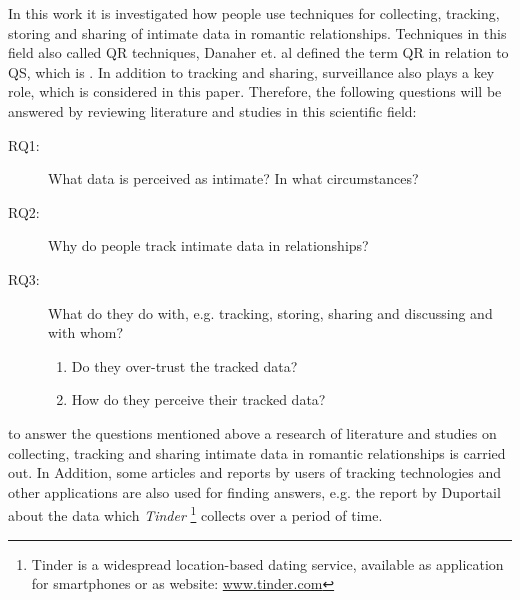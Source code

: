 In this work it is investigated how people use techniques for collecting, tracking, storing and sharing of intimate data in romantic relationships. Techniques in this field also called \ac{QR} techniques, Danaher et. al \cite{doi:10.1080/15265161.2017.1409823} defined the term \acs{QR} in relation to \ac{QS}, which is . In addition to tracking and sharing, surveillance also plays a key role, which is considered in this paper.
Therefore, the following questions will be answered by reviewing literature and studies in this scientific field:
 \begin{description}
 	\item[RQ1:] What data is perceived as intimate? In what circumstances?
 	\item[RQ2:] Why do people track intimate data in relationships?
 	\item[RQ3:] What do they do with, e.g. tracking, storing, sharing and discussing and with whom?
 	\begin{enumerate}
 		\item Do they over-trust the tracked data?
 		\item How do they perceive their tracked data?
 	\end{enumerate}
 \end{description}
to answer the questions mentioned above a research of literature and studies on collecting, tracking and sharing intimate data in romantic relationships is carried out. In Addition, some articles and reports by users of tracking technologies and other applications are also used for finding answers, e.g. the report by Duportail \cite{Duportail2017} about the data which \textit{Tinder} \footnote{Tinder is a widespread location-based dating service, available as application for smartphones or as website: \url{www.tinder.com}} collects over a period of time.


